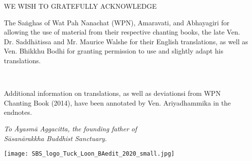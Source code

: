 \cleartorecto
\thispagestyle{empty}

\mbox{}\vfill

\begin{center}
WE WISH TO GRATEFULLY ACKNOWLEDGE
\end{center}

The Saṅghas of Wat Pah Nanachat (WPN), Amaravati, and Abhayagiri for allowing the use of material from their respective chanting books, the late Ven. Dr. Saddhātissa and Mr. Maurice Walshe for their English translations, as well as Ven. Bhikkhu Bodhi for granting permission to use and slightly adapt his translations.

\

Additional information on translations, as well as deviationsi from WPN Chanting Book (2014), have been annotated by Ven. Ariyadhammika in the endnotes.

\bigskip

{\centering\itshape
To Āyasmā Aggacitta, the founding father of\\
Sāsanārakkha Buddhist Sanctuary.

\bigskip

\texttt{[image: SBS\_logo\_Tuck\_Loon\_BAedit\_2020\_small.jpg]}
\par}

\vfill\mbox{}

